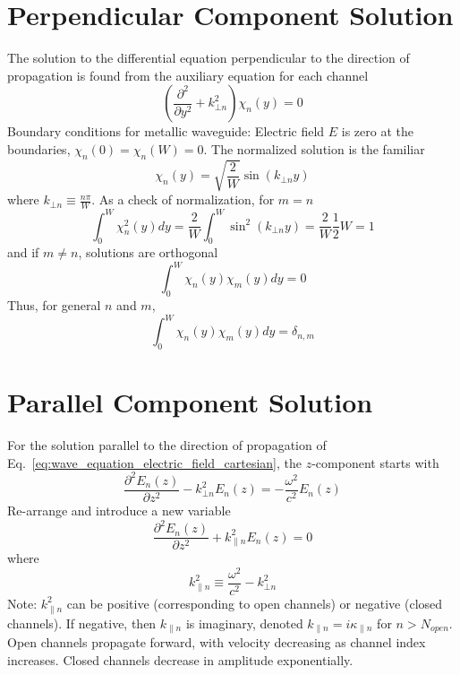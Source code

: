 \section{Perpendicular Component Solution}
The solution to the differential equation perpendicular to the direction of propagation is found from the auxiliary equation for each channel
\begin{equation}
\left(\frac{\partial^2}{\partial y^2} + k_{\bot n}^2 \right) \chi_n(y) = 0
\end{equation}
Boundary conditions for metallic waveguide: Electric field $E$ is zero at the boundaries, $\chi_n(0) = \chi_n(W) = 0$.
The normalized solution is the familiar
\begin{equation}
\chi_n(y) = \sqrt{\frac{2}{W}} \sin (k_{\bot n} y)
\end{equation}
where 
$k_{\bot n} \equiv \frac{n \pi}{W}$. 
As a check of normalization, for $m=n$
\begin{equation}
\int^W_0 \chi_n^2(y) dy = \frac{2}{W} \int^W_0 \sin^2 (k_{\bot n} y) = \frac{2}{W} \frac{1}{2} W = 1
\end{equation}
and if $m \neq n$, solutions are orthogonal
\begin{equation}
\int^W_0 \chi_n(y)\chi_m(y) dy = 0
\end{equation}
Thus, for general $n$ and $m$,
\begin{equation}
\int^W_0 \chi_n(y)\chi_m(y) dy = \delta_{n,m}
\label{eq:convert_to_kronecker}
\end{equation}

\section{Parallel Component Solution}
For the solution parallel to the direction of propagation of Eq.~\ref{eq:wave_equation_electric_field_cartesian}, the $z$-component starts with
\begin{equation}
\frac{\partial^2 E_n(z)}{\partial z^2} - k_{\bot n}^2 E_n(z) = - \frac{\omega^2}{c^2} E_n(z)
\end{equation}
Re-arrange and introduce a new variable
\begin{equation}
\frac{\partial^2 E_n(z)}{\partial z^2} + k_{\parallel n}^2 E_n(z) = 0
\label{eq:zcomponentdiffequ}
\end{equation}
where
\begin{equation}
k_{\parallel n}^2 \equiv \frac{\omega^2}{c^2} - k_{\bot n}^2
\label{eq:k_parallel}
\end{equation}
Note: $k_{\parallel n}^2$ can be positive (corresponding to open channels) or negative (closed channels). If negative, then $k_{\parallel n}$ is imaginary, denoted $k_{\parallel n} = i \kappa_{\parallel n}$ for $n > N_{open}$. Open channels propagate forward, with velocity decreasing as channel index increases. Closed channels decrease in amplitude exponentially.

